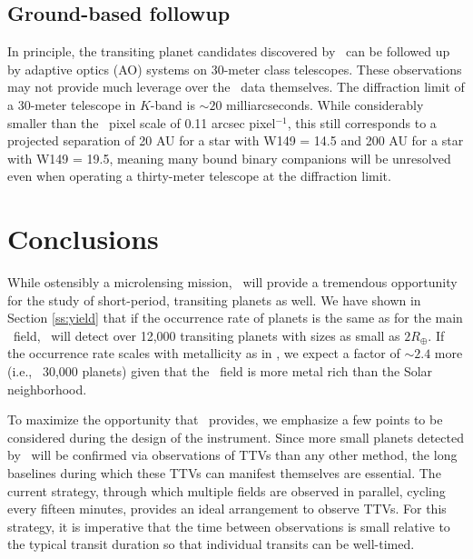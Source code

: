 \subsection{Ground-based followup}

In principle, the transiting planet candidates discovered by \WF\ can be followed
up by adaptive optics (AO) systems on 30-meter class telescopes. 
These observations may not provide much leverage over the \WF\ data themselves.
The diffraction limit of a 30-meter telescope in $K$-band is $\sim 20$ milliarcseconds.
While considerably smaller than the \WF\ pixel scale of 0.11 arcsec pixel$^{-1}$, this still
corresponds to a projected separation of 20 AU for a star with W149 = 14.5 and 200 AU
for a star with W149 = 19.5, meaning many bound binary companions will be unresolved 
even when operating a thirty-meter telescope at the diffraction limit.


\section{Conclusions}


While ostensibly a microlensing mission, \WF\ will provide a 
tremendous opportunity for the study of short-period, transiting planets as well. We have shown in Section \ref{ss:yield} that if the occurrence rate of planets is the same as for the main \kep\ field, \WF\ will detect over 12,000 transiting planets with sizes as small as $2 R_{\oplus}$. If the occurrence rate scales with metallicity as in \citet{Johnson10a}, we expect a factor of $\sim 2.4$ more (i.e., ~30,000 planets) given that the \WF\ field is more metal rich than the Solar neighborhood.

To maximize the opportunity that \WF\ provides, we emphasize a few points to be considered 
during the 
design of the instrument.
Since more small planets detected by \WF\ will be confirmed via observations of 
TTVs than any other method, the long baselines during which these TTVs can manifest
themselves are essential. 
The current strategy, through which multiple fields are observed in parallel, cycling
every fifteen minutes, provides an ideal arrangement to observe TTVs.
For this strategy, it is imperative that the time between observations is small relative
to the typical transit duration so that individual transits can be well-timed.


